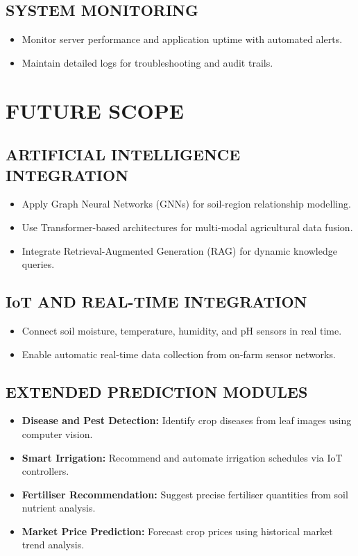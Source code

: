 \documentclass[12pt,a4paper,oneside]{report}
\begin{document}
\section{SYSTEM MONITORING}
\begin{itemize}[leftmargin=*, label=$\bullet$]
  \item Monitor server performance and application uptime with automated alerts.
  \item Maintain detailed logs for troubleshooting and audit trails.
\end{itemize}

\chapter{FUTURE SCOPE}

\section{ARTIFICIAL INTELLIGENCE INTEGRATION}
\begin{itemize}[leftmargin=*, label=$\bullet$]
  \item Apply Graph Neural Networks (GNNs) for soil-region relationship modelling.
  \item Use Transformer-based architectures for multi-modal agricultural data fusion.
  \item Integrate Retrieval-Augmented Generation (RAG) for dynamic knowledge queries.
\end{itemize}

\section{IoT AND REAL-TIME INTEGRATION}
\begin{itemize}[leftmargin=*, label=$\bullet$]
  \item Connect soil moisture, temperature, humidity, and pH sensors in real time.
  \item Enable automatic real-time data collection from on-farm sensor networks.
\end{itemize}

\section{EXTENDED PREDICTION MODULES}
\begin{itemize}[leftmargin=*, label=$\bullet$]
  \item \textbf{Disease and Pest Detection:} Identify crop diseases from leaf images using computer vision.
  \item \textbf{Smart Irrigation:} Recommend and automate irrigation schedules via IoT controllers.
  \item \textbf{Fertiliser Recommendation:} Suggest precise fertiliser quantities from soil nutrient analysis.
  \item \textbf{Market Price Prediction:} Forecast crop prices using historical market trend analysis.
\end{itemize}
\end{document}

